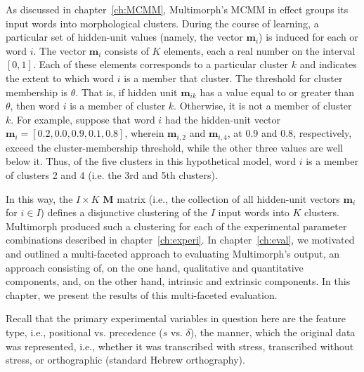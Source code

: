 As discussed in chapter~\ref{ch:MCMM}, Multimorph's \ac{MCMM} in effect groups its input words into morphological clusters. 
During the course of learning, a particular set of hidden-unit values (namely, the vector $\mathbf{m}_{i}$) is induced for each or word $i$. 
The vector $\mathbf{m}_{i}$ consists of $K$ elements, each a real number on the interval $[0,1]$. 
Each of these elements corresponds to a particular cluster $k$ and indicates the extent to which word $i$ is a member that cluster.
The threshold for cluster membership is $\theta$. That is, if hidden unit $\mathbf{m}_{ik}$ has a value equal to or greater than 
$\theta$, then word $i$ is a member of cluster $k$. Otherwise, it is not a member of cluster $k$. 
For example, suppose that word $i$ had the hidden-unit vector $\mathbf{m}_{i} = [0.2, 0.0,0.9,0.1,0.8]$, 
wherein $\mathbf{m}_{i,2}$ and $\mathbf{m}_{i,4}$, at 0.9 and 0.8, respectively, exceed the cluster-membership 
threshold, while the other three values
are well below it. Thus, of the five clusters in this hypothetical model, word $i$ is a member of clusters 
2 and 4 (i.e. the 3rd and 5th clusters).

In this way, the $I \times K$ $\mathbf{M}$ matrix (i.e., the collection of all hidden-unit vectors $\mathbf{m}_i$ for $i \in I$) 
defines a disjunctive clustering of the $I$ input words into $K$ clusters. Multimorph produced such a clustering for 
each of the experimental parameter combinations described in chapter~\ref{ch:experi}. In chapter~\ref{ch:eval}, 
we motivated and outlined a multi-faceted approach to evaluating Multimorph's output, an approach consisting of, 
on the one hand, qualitative and quantitative components, and, on the other hand, intrinsic and extrinsic components. 
In this chapter, we present the results of this multi-faceted evaluation. 

Recall that the primary experimental variables in question here are the feature type, i.e.,  positional vs. precedence ($s$ vs. $\delta$),
the manner, which the original data was represented, i.e., whether it was transcribed with stress, transcribed without stress,
or orthographic (standard Hebrew orthography).

